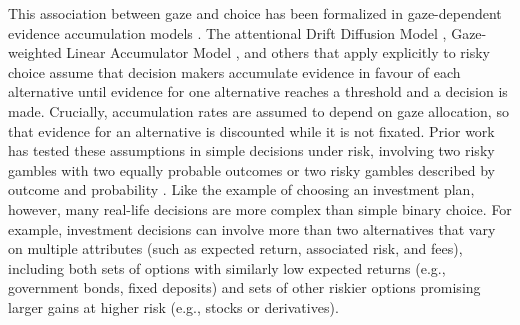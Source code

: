 \documentclass[11pt, a4paper]{article}
\begin{document}
This association between gaze and choice has been formalized in gaze-dependent evidence accumulation models \parencite[e.g.,][]{cavanagh2014EyeTrackingPupillometry,glickman2019FormationPreferenceRisky,gluth2018ValuebasedAttentionalCapture,krajbich2010VisualFixationsComputation,krajbich2011MultialternativeDriftdiffusionModel,molter2019GLAMboxPythonToolbox,thomas2019GazeBiasDifferences,tavares2017AttentionalDriftDiffusion}. The attentional Drift Diffusion Model \parencite[aDDM;][]{krajbich2010VisualFixationsComputation}, Gaze-weighted Linear Accumulator Model \parencite{molter2019GLAMboxPythonToolbox,thomas2019GazeBiasDifferences}, and others that apply explicitly to risky choice \parencite{glickman2019FormationPreferenceRisky} assume that decision makers accumulate evidence in favour of each alternative until evidence for one alternative reaches a threshold and a decision is made. Crucially, accumulation rates are assumed to depend on gaze allocation, so that evidence for an alternative is discounted while it is not fixated. Prior work has tested these assumptions in simple decisions under risk, involving two risky gambles with two equally probable outcomes \parencite{smith2018AttentionChoiceDomains} or two risky gambles described by outcome and probability \parencite{glickman2019FormationPreferenceRisky}. Like the example of choosing an investment plan, however, many real-life decisions are more complex than simple binary choice. For example, investment decisions can involve more than two alternatives that vary on multiple attributes (such as expected return, associated risk, and fees), including both sets of options with similarly low expected returns (e.g., government bonds, fixed deposits) and sets of other riskier options promising larger gains at higher risk (e.g., stocks or derivatives).
\end{document}
